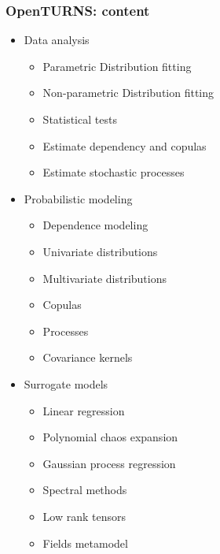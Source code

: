 \documentclass[aspectratio=169]{beamer}
\begin{document}
\begin{frame}[containsverbatim]
  \frametitle{OpenTURNS: content}
  
  \begin{scriptsize}
  
  \begin{minipage}[t]{0.33\textwidth}
  \begin{itemize}
  \item Data analysis
  \begin{itemize}
  \tiny
  \item Parametric Distribution fitting
  \item Non-parametric Distribution fitting
  \item Statistical tests
  \item Estimate dependency and copulas
  \item Estimate stochastic processes
  \end{itemize}
  \end{itemize}
  \end{minipage}%
  \begin{minipage}[t]{0.33\textwidth}
  \begin{itemize}
  \item Probabilistic modeling
  \begin{itemize}
  \tiny
  \item Dependence modeling
  \item Univariate distributions
  \item Multivariate distributions
  \item Copulas
  \item Processes 
  \item Covariance kernels
  \end{itemize}
  \end{itemize}
  \end{minipage}%
  \begin{minipage}[t]{0.33\textwidth}
  \begin{itemize}
  \item Surrogate models
  \begin{itemize}
  \tiny
  \item Linear regression
  \item Polynomial chaos expansion
  \item Gaussian  process regression
  \item Spectral methods
  \item Low rank tensors
  \item Fields metamodel
  \end{itemize}
  \end{itemize}
  \end{minipage}
  

\end{scriptsize}
\end{frame}
\end{document}
